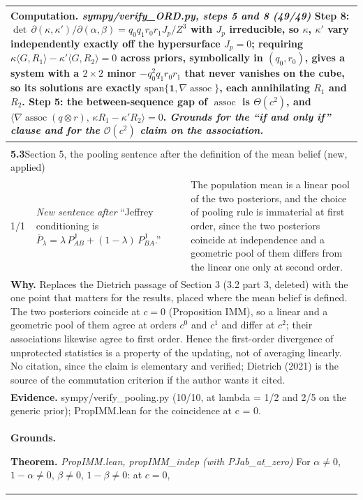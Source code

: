 \documentclass[10pt]{article}
\theoremstyle{definition}
\newcommand{\PJ}{P^{\mathrm{J}}}
\newcommand{\Pbar}{\overline{P}}
\newcommand{\assoc}{\operatorname{assoc}}
\newcommand{\bigO}{\mathcal{O}}
\newlength{\fullw}\setlength{\fullw}{25.9cm}
\newcommand{\entryhead}[2]{\multicolumn{3}{|l|}{\rule{0pt}{2.6ex}\large\textbf{#1}\quad #2} \\ \hline}
\begin{document}
{\begin{longtable}{|p{0.9cm}|p{12.2cm}|p{12.2cm}|}
\multicolumn{3}{|p{\fullw}|}{\textbf{Computation.} \textit{sympy/verify\_ORD.py, steps 5 and 8 (49/49)} \newline Step 8: $\det\,\partial(\kappa,\kappa')/\partial(\alpha,\beta)=q_0q_1r_0r_1J_p/Z^3$ with
$J_p$ irreducible, so $\kappa$, $\kappa'$ vary independently exactly off the hypersurface
$J_p=0$; requiring $\kappa\langle G,R_1\rangle-\kappa'\langle G,R_2\rangle=0$ across priors,
symbolically in $(q_0,r_0)$, gives a system with a $2\times2$ minor $-q_0^2q_1r_0r_1$ that
never vanishes on the cube, so its solutions are exactly $\mathrm{span}\{\mathbf 1,\nabla\assoc\}$,
each annihilating $R_1$ and $R_2$. Step 5: the between-sequence
gap of $\assoc$ is $\Theta(c^2)$, and
$\langle\nabla\assoc(q\otimes r),\,\kappa R_1-\kappa'R_2\rangle=0$. \newline \textit{Grounds for the ``if and only if'' clause and for the $\bigO(c^2)$ claim on the association.}} \\ \hline
\multicolumn{3}{|l|}{} \\ \hline
\entryhead{5.3}{Section 5, the pooling sentence after the definition of the mean belief (new, applied)\quad{\footnotesize\textit{(formerly C.16)}}}
1/1 & \textit{New sentence after} ``Jeffrey conditioning is $\Pbar_\lambda=\lambda\,\PJ_{AB}+(1-\lambda)\,\PJ_{BA}$.'' & The population mean is a linear pool of the two posteriors, and the choice of pooling rule is immaterial at first order, since the two posteriors coincide at independence and a geometric pool of them differs from the linear one only at second order. \\ \hline
\multicolumn{3}{|p{\fullw}|}{\textbf{Why.} Replaces the Dietrich passage of Section 3 (3.2 part 3, deleted) with the one point that matters for the results, placed where the mean belief is defined. The two posteriors coincide at $c=0$ (Proposition IMM), so a linear and a geometric pool of them agree at orders $c^0$ and $c^1$ and differ at $c^2$; their associations likewise agree to first order. Hence the first-order divergence of unprotected statistics is a property of the updating, not of averaging linearly. No citation, since the claim is elementary and verified; Dietrich (2021) is the source of the commutation criterion if the author wants it cited.} \\
\multicolumn{3}{|p{\fullw}|}{\textbf{Evidence.} sympy/verify\_pooling.py (10/10, at lambda = 1/2 and 2/5 on the generic prior); PropIMM.lean for the coincidence at c = 0.} \\ \hline
\multicolumn{3}{|p{\fullw}|}{\textbf{Grounds.}\par \textbf{Theorem.} \textit{PropIMM.lean, propIMM\_indep (with PJab\_at\_zero)} \newline For $\alpha\neq0$, $1-\alpha\neq0$, $\beta\neq0$, $1-\beta\neq0$: at $c=0$,
}
\end{longtable}}
\end{document}
